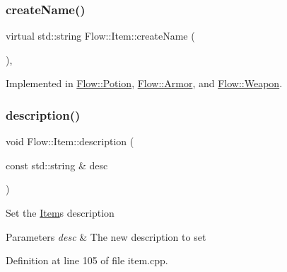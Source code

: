 \hypertarget{class_flow_1_1_item_a775605940d8a063e7cf5c7d87820d4d1}{}\label{class_flow_1_1_item_a775605940d8a063e7cf5c7d87820d4d1} 
\subsubsection{\texorpdfstring{create\+Name()}{createName()}}
{\footnotesize\ttfamily virtual std\+::string Flow\+::\+Item\+::create\+Name (\begin{DoxyParamCaption}{ }\end{DoxyParamCaption})\hspace{0.3cm}{\ttfamily [protected]}, {}}



Implemented in \hyperlink{class_flow_1_1_potion_ab21ab2dbee0ff4bb9dbe9cba6689ea34}{Flow\+::\+Potion}, \hyperlink{class_flow_1_1_armor_af8706de01294d876610c7a821e39dc84}{Flow\+::\+Armor}, and \hyperlink{class_flow_1_1_weapon_af8b4a298527dfc4e5c16d5ea2136841f}{Flow\+::\+Weapon}.

\hypertarget{class_flow_1_1_item_a479edd419531aa2db9f707efac66fa7b}{}\label{class_flow_1_1_item_a479edd419531aa2db9f707efac66fa7b} 
\subsubsection{\texorpdfstring{description()}{description()}\hspace{0.1cm}{\footnotesize\ttfamily [1/2]}}
{\footnotesize\ttfamily void Flow\+::\+Item\+::description (\begin{DoxyParamCaption}\item[{const std\+::string \&}]{desc }\end{DoxyParamCaption})}

Set the \hyperlink{class_flow_1_1_item}{Item}\textquotesingle{}s description 
\begin{DoxyParams}{Parameters}
{\em desc} & The new description to set \\
\hline
\end{DoxyParams}


Definition at line 105 of file item.\+cpp.

\hypertarget{class_flow_1_1_item_ade8afa150cf8f2b97ce7de8cfbc4f1df}{}\label{class_flow_1_1_item_ade8afa150cf8f2b97ce7de8cfbc4f1df} 
